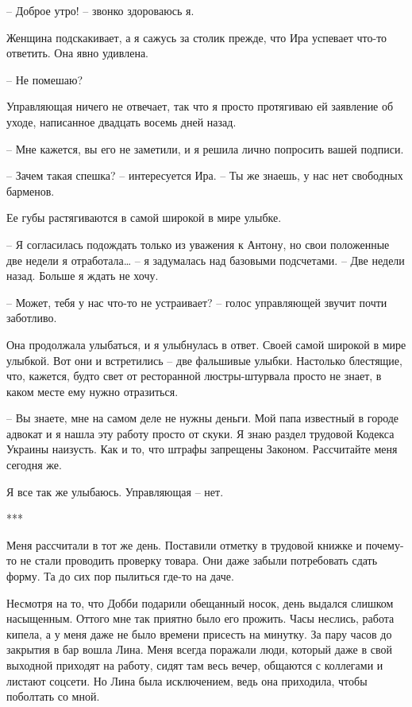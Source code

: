 \documentclass[
]{book}
\begin{document}
-- Доброе утро! -- звонко здороваюсь я.

Женщина подскакивает, а я сажусь за столик прежде, что Ира успевает что-то ответить. Она явно удивлена.

-- Не помешаю?

Управляющая ничего не отвечает, так что я просто протягиваю ей заявление об уходе, написанное двадцать восемь дней назад.

-- Мне кажется, вы его не заметили, и я решила лично попросить вашей подписи.

-- Зачем такая спешка? -- интересуется Ира. -- Ты же знаешь, у нас нет свободных барменов.

Ее губы растягиваются в самой широкой в мире улыбке.

-- Я согласилась подождать только из уважения к Антону, но свои положенные две недели я отработала\ldots{} -- я задумалась над базовыми подсчетами. -- Две недели назад. Больше я ждать не хочу.

-- Может, тебя у нас что-то не устраивает? -- голос управляющей звучит почти заботливо.

Она продолжала улыбаться, и я улыбнулась в ответ. Своей самой широкой в мире улыбкой. Вот они и встретились -- две фальшивые улыбки. Настолько блестящие, что, кажется, будто свет от ресторанной люстры-штурвала просто не знает, в каком месте ему нужно отразиться.

-- Вы знаете, мне на самом деле не нужны деньги. Мой папа известный в городе адвокат и я нашла эту работу просто от скуки. Я знаю раздел трудовой Кодекса Украины наизусть. Как и то, что штрафы запрещены Законом. Рассчитайте меня сегодня же.

Я все так же улыбаюсь. Управляющая -- нет.

***

Меня рассчитали в тот же день. Поставили отметку в трудовой книжке и почему-то не стали проводить проверку товара. Они даже забыли потребовать сдать форму. Та до сих пор пылиться где-то на даче.

Несмотря на то, что Добби подарили обещанный носок, день выдался слишком насыщенным. Оттого мне так приятно было его прожить. Часы неслись, работа кипела, а у меня даже не было времени присесть на минутку. За пару часов до закрытия в бар вошла Лина. Меня всегда поражали люди, который даже в свой выходной приходят на работу, сидят там весь вечер, общаются с коллегами и листают соцсети. Но Лина была исключением, ведь она приходила, чтобы поболтать со мной.
\end{document}
